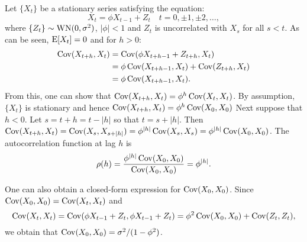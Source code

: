 \begin{example}
Let $\{ X_t \}$ be a stationary series satisfying the equation:
\begin{equation}
    X_t = \phi X_{t - 1} + Z_t \quad t = 0, \pm 1, \pm 2, \ldots,
\end{equation}
where $\{ Z_t \} \sim \operatorname{WN}(0, \sigma^2)$, $|\phi| < 1$ and $Z_t$ is uncorrelated 
with $X_s$ for all $s < t$. As can be seen, $\operatorname{E} [X_t] = 0$ and for $h > 0$:
\begin{align*}
\operatorname{Cov} (X_{t + h}, X_t) 
    & = \operatorname{Cov} (\phi X_{t + h - 1} + Z_{t + h}, X_t) \\
    & = \phi \operatorname{Cov} (X_{t + h - 1}, X_t) + \operatorname{Cov} (Z_{t + h}, X_t) \\
    & = \phi \operatorname{Cov} (X_{t + h - 1}, X_t).
\end{align*}
From this, one can show that $\operatorname{Cov} (X_{t + h}, X_t) = \phi^h \operatorname{Cov} (X_t, X_t)$. 
By assumption, $\{ X_t \}$ is stationary and hence 
$\operatorname{Cov} (X_{t + h}, X_t) = \phi^h \operatorname{Cov} (X_0, X_0)$
Next suppose that $h < 0$. Let $s = t + h = t - |h|$ so that $t = s + |h|$. 
Then $\operatorname{Cov} (X_{t + h}, X_t) = \operatorname{Cov} (X_s, X_{s + |h|}) = 
\phi^{|h|} \operatorname{Cov} (X_s, X_s) = \phi^{|h|} \operatorname{Cov} (X_0, X_0)$. 
The autocorrelation function at lag $h$ is 
\[
    \rho(h) = \frac{ \phi^{|h|}  \operatorname{Cov} (X_0, X_0) }{ \operatorname{Cov} (X_0, X_0)} = \phi^{|h|}.
\]

One can also obtain a closed-form expression for $\operatorname{Cov} (X_0, X_0)$. Since 
$\operatorname{Cov} (X_0, X_0) = \operatorname{Cov} (X_t, X_t)$ and 
\[
    \operatorname{Cov} (X_t, X_t) = \operatorname{Cov} (\phi X_{t - 1} + Z_t, \phi X_{t - 1} + Z_t) 
    = \phi^2 \operatorname{Cov} (X_0, X_0) + \operatorname{Cov} (Z_t, Z_t), 
\]
we obtain that $\operatorname{Cov} (X_0, X_0) = \sigma^2 / (1 - \phi^2)$.
\end{example}



